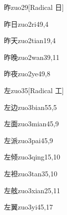 \begin{entry}{昨}{zuo2}{9}[Radical 日]
\end{entry}

\begin{entry}{昨日}{zuo2ri4}{9,4}
\end{entry}

\begin{entry}{昨天}{zuo2tian1}{9,4}
\end{entry}

\begin{entry}{昨晚}{zuo2wan3}{9,11}
\end{entry}

\begin{entry}{昨夜}{zuo2ye4}{9,8}
\end{entry}

\begin{entry}{左}{zuo3}{5}[Radical 工]
\end{entry}

\begin{entry}{左边}{zuo3bian5}{5,5}
\end{entry}

\begin{entry}{左面}{zuo3mian4}{5,9}
\end{entry}

\begin{entry}{左派}{zuo3pai4}{5,9}
\end{entry}

\begin{entry}{左倾}{zuo3qing1}{5,10}
\end{entry}

\begin{entry}{左袒}{zuo3tan3}{5,10}
\end{entry}

\begin{entry}{左舷}{zuo3xian2}{5,11}
\end{entry}

\begin{entry}{左翼}{zuo3yi4}{5,17}
\end{entry}

